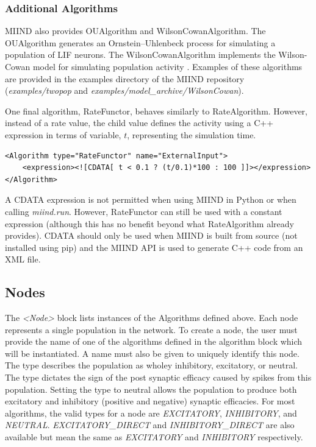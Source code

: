 \documentclass[utf8]{frontiersSCNS} %
\begin{document}
\subsubsection{Additional Algorithms}
MIIND also provides OUAlgorithm and WilsonCowanAlgorithm. The OUAlgorithm generates an Ornstein–Uhlenbeck process \citep{uhlenbeck1930theory} for simulating a population of LIF neurons. The WilsonCowanAlgorithm implements the Wilson-Cowan model for simulating population activity \citep{wilson1972excitatory}. Examples of these algorithms are provided in the examples directory of the MIIND repository (\textit{examples/twopop} and \textit{examples/model\_archive/WilsonCowan}).

One final algorithm, RateFunctor, behaves similarly to RateAlgorithm. However, instead of a rate value, the child value defines the activity using a C++ expression in terms of variable, $t$, representing the simulation time.

\begin{lstlisting}[caption={A RateFunctor algorithm definition in which the firing rate linearly increases to 100Hz over 0.1 seconds and remains at 100Hz thereafter.}]
<Algorithm type="RateFunctor" name="ExternalInput">
	<expression><![CDATA[ t < 0.1 ? (t/0.1)*100 : 100 ]]></expression>
</Algorithm>
\end{lstlisting}

A CDATA expression is not permitted when using MIIND in Python or when calling \textit{miind.run}. However, RateFunctor can still be used with a constant expression (although this has no benefit beyond what RateAlgorithm already provides). CDATA should only be used when MIIND is built from source (not installed using pip) and the MIIND API is used to generate C++ code from an XML file.

\subsection{Nodes}

The \textit{\textless Node\textgreater} block lists instances of the Algorithms defined above. Each node represents a single population in the network. To create a node, the user must provide the name of one of the algorithms defined in the algorithm block which will be instantiated. A name must also be given to uniquely identify this node. The type describes the population as wholey inhibitory, excitatory, or neutral. The type dictates the sign of the post synaptic efficacy caused by spikes from this population. Setting the type to neutral allows the population to produce both excitatory and inhibitory (positive and negative) synaptic efficacies. For most algorithms, the valid types for a node are \textit{EXCITATORY}, \textit{INHIBITORY}, and \textit{NEUTRAL}. \textit{EXCITATORY\_DIRECT} and \textit{INHIBITORY\_DIRECT} are also available but mean the same as \textit{EXCITATORY} and \textit{INHIBITORY} respectively.
\end{document}
